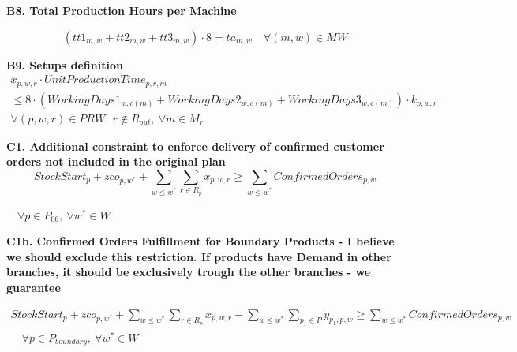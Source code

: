 \documentclass{article}
\begin{document}
\noindent\textbf{B8. Total Production Hours per Machine}

\begin{equation}
\left( tt1_{m,w} + tt2_{m,w} + tt3_{m,w} \right) \cdot 8 
= ta_{m,w}
\quad \forall (m,w) \in MW
\label{eq:B8}
\end{equation}



\noindent\textbf{B9. Setups definition}
\begin{equation}
\begin{gathered}
x_{p,w,r} \cdot UnitProductionTime_{p,r,m} \\
\leq 8 \cdot (WorkingDays1_{w,c(m)} + 
WorkingDays2_{w,c(m)} + 
WorkingDays3_{w,c(m)}) \cdot k_{p,w,r} \\
\forall (p,w,r) \in PRW,\ r \notin R_{out},\ \forall m \in M_r
\end{gathered}
\label{eq:B9}
\end{equation}


\noindent\text{---------------------------------------------------------------------------------------------------------}

\noindent\textbf{C1. Additional constraint to enforce delivery of confirmed customer orders not included in the original plan}
\begin{equation}
StockStart_p + zco_{p,w^*} + 
\sum_{w \leq w^*} \sum_{ r \in R_p} x_{p,w,r}
\geq \sum_{w \leq w^*} ConfirmedOrders_{p,w}
\label{eq:C1}
\end{equation}

\begin{center}
$\quad \forall p \in P_{06},\ \forall w^* \in W   $
\end{center}




\noindent\textbf{C1b. Confirmed Orders Fulfillment for Boundary Products - I believe we should exclude this restriction. If products have Demand in other branches, it should be exclusively trough the other branches - we guarantee} 

\begin{equation}
\begin{gathered}
StockStart_p + zco_{p,w^*} + 
\sum_{w \leq w^*} \sum_{ r \in R_p} x_{p,w,r}
- \sum_{w \leq w^*} \sum_{p_1 \in P} y_{p_1,p,w}
\geq \sum_{w \leq w^*} ConfirmedOrders_{p,w} \\
\quad \forall p \in P_{boundary},\ \forall w^* \in W
\end{gathered}
\label{eq:C1b}
\end{equation}
\end{document}
